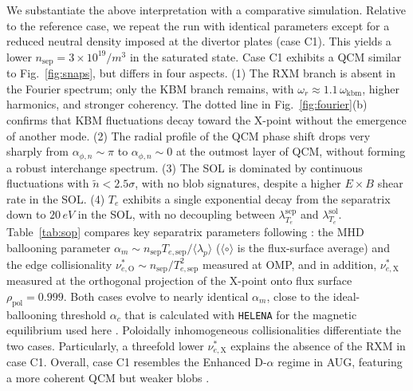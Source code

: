 \documentclass[aps,prl,twocolumn,superscriptaddress]{revtex4-2}
\def  \rpol {\rho_\mathrm{pol}}
\def  \nsep {n_\mathrm{sep}}
\begin{document}
We substantiate the above interpretation with a comparative simulation.
Relative to the
reference case, we repeat the run with identical parameters except for a reduced neutral density imposed at the divertor plates (case C1).
This yields a lower $\nsep=3\times10^{19}/\si{m}^3$ in the saturated state.
Case C1 exhibits a QCM similar to Fig.~\ref{fig:snaps}, but differs in four aspects.
(1) The RXM branch is absent in the Fourier spectrum; only the KBM branch remains, with $\omega_r\approx 1.1\, \omega_{\mathrm{kbm}}$, higher harmonics, and stronger coherency.
The dotted line in Fig.~\ref{fig:fourier}(b) confirms that KBM fluctuations decay toward the X-point without the emergence of another mode.
(2) The radial profile of the QCM phase shift drops very sharply from $\alpha_{\phi,n}\sim\pi$ to $\alpha_{\phi,n}\sim0$ at the outmost layer of QCM, without forming a robust interchange spectrum.
(3) The SOL is dominated by continuous fluctuations with $\tilde{n}<2.5\sigma$, with no blob signatures, {despite a higher $E\times B$ shear rate in the SOL}.
(4) $T_e$ exhibits a single exponential decay from the separatrix down to $20\,\si{eV}$ in the SOL, with no decoupling between $\lambda_{T_e}^{\mathrm{sep}}$ and $\lambda_{T_e}^{\mathrm{sol}}$.
Table~\ref{tab:sop} compares key separatrix parameters following \cite{faitsch2023analysis}: the MHD ballooning parameter $\alpha_m\sim \nsep T_{e,\mathrm{sep}}/\langle \lambda_p\rangle$  ($\langle \circ \rangle$ is the flux-surface average) and the edge collisionality $\nu^{*}_{e,\mathrm{O}}\sim \nsep/T_{e,\mathrm{sep}}^2$ measured at OMP, {and in addition, $\nu^{*}_{e,\mathrm{X}}$ measured at the orthogonal projection of the X-point onto flux surface $\rpol=0.999$.}
Both cases evolve to nearly identical $\alpha_m$, close to the ideal-ballooning threshold $\alpha_{c}$ that is calculated with \texttt{HELENA} for the magnetic equilibrium used here \cite{radovanovicDevelopingPhysicsUnderstanding2022}.
{Poloidally inhomogeneous collisionalities differentiate the two cases.
Particularly, a threefold lower $\nu^{*}_{e,\mathrm{X}}$ explains the absence of the RXM in case C1.}
Overall, case C1 resembles the Enhanced D-$\alpha$ regime in AUG, featuring a more coherent QCM but weaker blobs \cite{gil2020stationary}.
\end{document}
